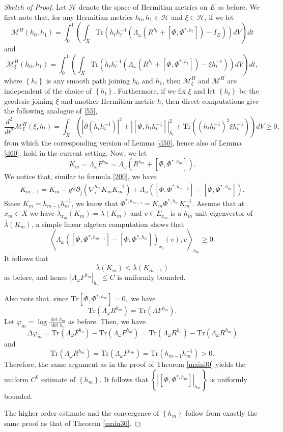 \documentclass[11pt]{amsart}
\numberwithin{equation}{section}
\theoremstyle{remark}
\renewcommand{\bar}{\overline}
\newcommand{\pa}{\partial}
\renewcommand{\phi}{\varphi}
\newcommand{\M}{{\mathcal M}}
\newcommand{\lb}{\left (}
\newcommand{\rb}{\right )}
\newcommand{\lsb}{\left [}
\newcommand{\rsb}{\right ]}
\newcommand{\lfb}{\left \{}
\newcommand{\rfb}{\right \}}
\newcommand{\tr}{\text{Tr}}
\begin{document}
\begin{proof}  [Sketch of Proof]
Let  $\mathcal H$ denote the space of Hermitian metrics on $E$ as before. We first note that, for any  Hermitian metrics $h_0, h_1\in \mathcal H$ and $\xi \in \mathcal H$, if we let
\[
\M^H\lb h_0,h_1\rb =\int_0^1 \lb \int_X \tr \lb \dot h_t h_t^{-1}\lb \Lambda_\omega \lb R^{h_t}+\lsb\Phi,\Phi^{*,{h_t}}\rsb\rb- I_E\rb\rb dV\rb dt
\]
and
\[
\M_{\xi}^H\lb h_0,h_1\rb=\int_0^1 \lb \int_X \tr \lb \dot h_t h_t^{-1}\lb \Lambda_\omega \lb R^{h_t}+\lsb\Phi,\Phi^{*,{h_t}}\rsb\rb-\xi h_t^{-1}\rb\rb dV\rb dt,
\]
where $\lfb h_t\rfb$ is any smooth path joining $h_0$ and $h_1$, then $\M_{\xi}^H$ and $\M^H$ are independent of the choice of $\lfb h_t\rfb$. Furthermore, if we fix $\xi$ and let $\lfb h_t\rfb$ be the geodesic joining $\xi$ and another Hermitian metric $h$, then direct computations give the following analogue of \eqref{55},
\[
\frac{d^2}{dt^2}\M_{\xi}^H\lb \xi, h_t\rb=\int_X \lb \left |\bar\pa\lb \dot h_t h_t^{-1}\rb\right |^2+\left | \lsb \Phi,\dot h_t h_t^{-1}\rsb \right |_{h_t}^2
+\tr\lb \lb\dot h_t h_t^{-1}\rb^2 \xi h_t^{-1}\rb\rb dV\geq 0,
\]
from which the corresponding version of  Lemma \ref{d50}, hence also of Lemma \ref{d60}, hold in the current setting.  Now, we let \[K_m=\Lambda_\omega F^{h_m}=\Lambda_\omega \lb R^{h_m}+\lsb\Phi,\Phi^{*,{h_m}}\rsb\rb.\] We notice that, similar to formula \eqref{200}, we have
\begin{eqnarray*}
K_{m-1}=K_m-g^{i\bar j}\pa_{\bar j}\lb \nabla_i^{h_m}K_m K_m^{-1} \rb
+\Lambda_\omega \lb \lsb\Phi,\Phi^{*,h_{m-1}}\rsb-\lsb\Phi,\Phi^{*,{h_m}}\rsb\rb.
\end{eqnarray*}
Since $K_m=h_{m-1}h_m^{-1}$, we know that $\Phi^{*,h_{m-1}}=K_m\Phi^{*,h_m}K_m^{-1}$. Assume that at $x_m\in X$ we have $\bar\lambda_{x_m}\lb K_m\rb=\bar\lambda \lb K_m\rb$ and $v\in E_{x_m}$ is a $h_m$-unit eigenvector of $\bar\lambda\lb K_m\rb$, a simple linear algebra computation shows that
\[
\left\langle  \Lambda_\omega\lb \lsb\Phi,\Phi^{*,h_{m-1}}\rsb-\lsb\Phi,\Phi^{*,{h_m}}\rsb\rb_{x_0}(v),v\right \rangle_{h_m}\geq 0.
\]
It follows that \[\bar\lambda \lb K_m\rb\leq \bar\lambda \lb K_{m-1}\rb\] as before, and hence $\left |\Lambda_\omega F^{h_m}\right |_{h_m}\leq C$ is uniformly bounded.

Also note that, since $\tr \lsb\Phi,\Phi^{*,{h_m}}\rsb=0,$ we have
\[\tr\lb \Lambda_\omega R^{h_m}\rb=\tr\lb \Lambda F^{h_m}\rb.\]
Let $\phi_m=\log \frac{\det h_m}{\det h_0}$ as before. Then, we have
\[\Delta \phi_m=\tr\lb \Lambda_\omega F^{h_0}\rb -\tr\lb \Lambda_\omega F^{h_m}\rb =\tr\lb \Lambda_\omega R^{h_0}\rb -\tr\lb \Lambda_\omega R^{h_m}\rb \]
and \[\tr\lb\Lambda_\omega R^{h_m}\rb =\tr\lb \Lambda_\omega F^{h_m}\rb =\tr \lb h_{m-1}h_m^{-1}\rb>0.\]
Therefore, the same argument as in the proof of Theorem \ref{main30} yields the uniform $C^0$ estimate of $\lfb h_m\rfb$. It follows that $\lfb\left | \lsb\Phi,\Phi^{*,{h_m}}\rsb\right |_{h_m}\rfb$ is uniformly bounded.

The higher order estimate and the convergence of $\lfb h_m\rfb$ follow from exactly the same proof as that of Theorem \ref{main30}.
\end{proof}
\end{document}
